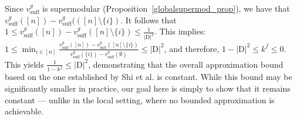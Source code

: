 \documentclass{article}
\begin{document}



Since $v^g_{\text{suff}}$ is supermodular (Proposition~\ref{globalsupermod_prop}), we have that
$v^g_{\text{suff}}([n]) - v^g_{\text{suff}}(([n] \setminus \{i\})$. It follows that $1 \leq v^g_{\text{suff}}([n]) - v^g_{\text{suff}}([n] \setminus \{i\}) \leq \frac{1}{|\text{D}|^2}$. This implies: $1 \leq \min_{i \in [n]} \frac{v^g_{\text{suff}}([n]) - v^g_{\text{suff}}([n] \setminus \{i\})}{v^g_{\text{suff}}(\{i\}) - v^g_{\text{suff}}(\emptyset)} \leq |\text{D}|^2$, and therefore, $1 - |\text{D}|^2 \leq k^f \leq 0$. This yields $\frac{1}{1 - k^f} \leq |\text{D}|^2$, demonstrating that the overall approximation bound based on the one established by Shi et al. is constant. While this bound may be significantly smaller in practice, our goal here is simply to show that it remains constant --- unlike in the local setting, where no bounded approximation is achievable.





\end{document}
